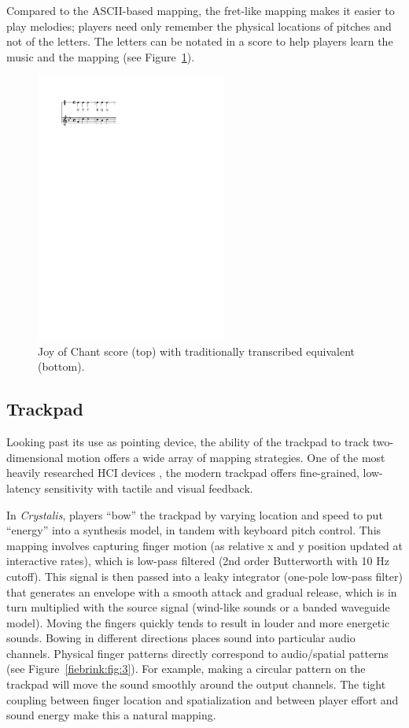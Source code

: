 Compared to the ASCII-based mapping, the fret-like mapping makes it easier to
play melodies; players need only remember the physical locations of pitches and
not of the letters. The letters can be notated in a score to help players learn
the music and the mapping (see Figure~\ref{fiebrink:fig:2}).

\begin{figure}[t]
\begin{center}
\includegraphics[width=178pt]{img-2-eps-converted-to.pdf}
\caption{Joy of Chant score (top) with traditionally transcribed equivalent
(bottom).}
\label{fiebrink:fig:2} 
\end{center}
\end{figure}


\subsection{Trackpad}
Looking past its use as pointing device, the ability of the trackpad to track
two-dimensional motion offers a wide array of mapping strategies. One of the most
heavily researched HCI devices \cite{Zhai:2004}, the modern trackpad offers fine-grained,
low-latency sensitivity with tactile and visual feedback.

In \textit{Crystalis}, players ``bow'' the trackpad by varying location and
speed to put ``energy'' into a synthesis model, in tandem with keyboard pitch
control. This mapping involves capturing finger motion (as relative x and y
position updated at interactive rates), which is low-pass filtered (2nd order
Butterworth with 10 Hz cutoff). This signal is then passed into a leaky
integrator (one-pole low-pass filter) that generates an envelope with a smooth
attack and gradual release, which is in turn multiplied with the source signal
(wind-like sounds or a banded waveguide model). Moving the fingers quickly tends
to result in louder and more energetic sounds. Bowing in different directions
places sound into particular audio channels. Physical finger patterns directly
correspond to audio/spatial patterns (see Figure~\ref{fiebrink:fig:3}). For example, making a
circular pattern on the trackpad will move the sound smoothly around the output
channels. The tight coupling between finger location and spatialization and
between player effort and sound energy make this a natural mapping.

